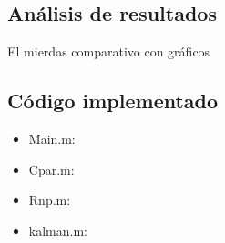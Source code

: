\subsection{Análisis de resultados}
El mierdas comparativo con gráficos

\subsection{Código implementado}
\begin{itemize}
\item Main.m:
	
	
\item Cpar.m:
	
	
\item Rnp.m:
	
	
\item kalman.m:
	

\end{itemize}

